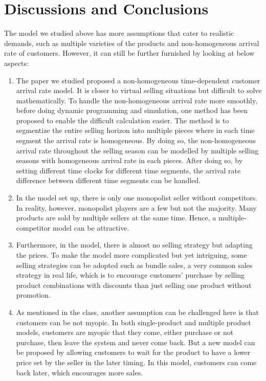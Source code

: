 \section{Discussions and Conclusions}
The model we studied above has more assumptions that cater to realistic demands, such as multiple varieties of the products and non-homogeneous arrival rate of customers. However, it can still be further furnished by looking at below aspects:
\begin{enumerate}
\item The paper we studied proposed a non-homogeneous time-dependent customer arrival rate model. It is closer to virtual selling situations but difficult to solve mathematically. To handle the non-homogeneous arrival rate more smoothly, before doing dynamic programming and simulation, one method has been proposed to enable the difficult calculation easier. The method is to segmentize the entire selling horizon into multiple pieces where in each time segment the arrival rate is homogeneous. By doing so, the non-homogeneous arrival rate throughout the selling season can be modelled by multiple selling seasons with homogeneous arrival rate in each pieces. After doing so, by setting different time clocks for different time segments, the arrival rate difference between different time segments can be handled. 
\item In the model set up, there is only one monopolist seller without competitors. In reality, however, monopolist players are a few but not the majority. Many products are sold by multiple sellers at the same time. Hence, a multiple-competitor model can be attractive. 

\item Furthermore, in the model, there is almost no selling strategy but adapting the prices. To make the model more complicated but yet intriguing, some selling strategies can be adopted such as bundle sales, a very common sales strategy in real life, which is to encourage customers' purchase by selling product combinations with discounts than just selling one product without promotion.

\item As mentioned in the class, another assumption can be challenged here is that customers can be not myopic. In both single-product and multiple product models, customers are myopic that they come, either purchase or not purchase, then leave the system and never come back. But a new model can be proposed by allowing customers to wait for the product to have a lower price set by the seller in the later timing. In this model, customers can come back later, which encourages more sales.

\end{enumerate}







